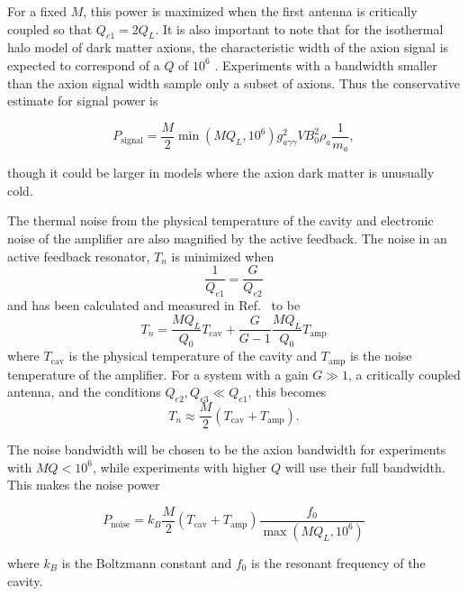 \documentclass[aps,prl,twocolumn,groupedaddress]{revtex4-1}
\begin{document}
For a fixed $M$, this power is maximized when the first antenna is critically coupled so that $Q_{e1}=2Q_{L}$.  It is also important to note that for the isothermal halo model of dark matter axions,  the characteristic width of the axion signal is expected to correspond of a $Q$ of $10^6$ \cite{Cavity_idea}.   Experiments with a bandwidth smaller than the axion signal width sample only a subset of axions.  Thus the conservative estimate for signal power is

\begin{equation}
\label{eqn:sig}
P_{\mathrm{signal}}=\frac{M}{2}\min\left(MQ_L,10^6\right)g_{a\gamma\gamma}^2VB_0^2\rho_a\frac{1}{m_a},
\end{equation}

though it could be larger in models where the axion dark matter is unusually cold.

The thermal noise from the physical temperature of the cavity and electronic noise of the amplifier are also magnified by the active feedback.
The noise in an active feedback resonator, $T_n$ is minimized when
\begin{equation}
\frac{1}{Q_{e1}}=\frac{G}{Q_{e2}}
\end{equation} 
and has been calculated and measured in Ref.~\cite{noise_temp_afr} to be
\begin{equation}
T_n=\frac{MQ_L}{Q_{0}}T_{\mathrm{cav}}+\frac{G}{G-1}\frac{MQ_L}{Q_{0}}T_{\mathrm{amp}}
\end{equation}
where $T_{\mathrm{cav}}$ is the physical temperature of the cavity and $T_{\mathrm{amp}}$ is the noise temperature of the amplifier.   For a system with a gain $G\gg1$, a critically coupled antenna, and the conditions $Q_{e2},Q_{e3}\ll Q_{e1}$, this becomes
\begin{equation}
T_n\approx\frac{M}{2}\left(T_{\mathrm{cav}}+T_{\mathrm{amp}}\right).
\end{equation}

The noise bandwidth will be chosen to be the axion bandwidth for experiments with $MQ<10^6$, while experiments with higher $Q$ will use their full bandwidth.  This makes the noise power

\begin{equation}
\label{eqn:noise}
P_{\mathrm{noise}}=k_B\frac{M}{2}\left(T_{\mathrm{cav}}+T_{\mathrm{amp}}\right)\frac{f_0}{\max\left(MQ_L,10^6\right)}
\end{equation}

where $k_B$ is the Boltzmann constant and $f_0$ is the resonant frequency of the cavity.
\end{document}
